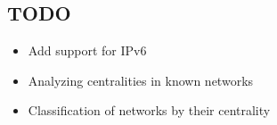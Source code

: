 \documentclass[documentation]{subfiles}
\begin{document}
\subsection{TODO}

\begin{itemize}
    \item Add support for IPv6
    \item Analyzing centralities in known networks
    \item Classification of networks by their centrality
\end{itemize}
\end{document}
